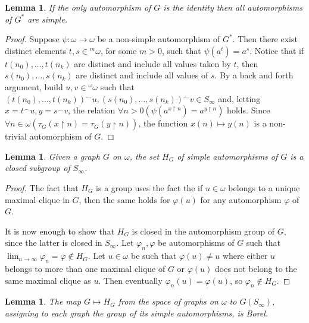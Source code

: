\documentclass{amsart}
\newtheorem{lemma}[theorem]{Lemma}
\theoremstyle{definition}
\theoremstyle{remark}
\begin{document}
\begin{lemma}\label{lemmasimple}
If the only automorphism of $G$ is the identity then all automorphisms
of $G^*$ are simple.
\end{lemma}

\begin{proof}
Suppose $\psi \colon \omega \to \omega $ be a non-simple automorphism of $G^*$.
Then there exist distinct elements $t, s \in {}^m\omega$, for some $m>0$, such that $\psi (a^t)=a^s$.
Notice that if $t(n_0),\dotsc ,t(n_k)$ are distinct and include all
values taken by $t$, then $s(n_0),\dotsc ,s(n_k)$ are distinct and
include all values of $s$.
By a back and forth argument, build $u,v\in {}^{\omega }\omega$ such
that $(t(n_0),\dotsc ,t(n_k))^{\smallfrown }u,(s(n_0),\dotsc
,s(n_k))^{\smallfrown }v \in S_{\infty }$ and, letting
$x=t^{\smallfrown }u,y=s^{\smallfrown }v$, the relation $\forall n>0(\psi(a^{x\restriction n})=a^{y\restriction n})$ holds.
Since $\forall n \in \omega (\tau_G(x\restriction
n)=\tau_G(y\restriction n))$, the function $x(n)\mapsto y(n)$ is a
non-trivial automorphism of $G$.
\end{proof}

\begin{lemma}
Given a graph $G$ on $\omega $, the set $H_G$ of simple
automorphisms of $G$ is a closed subgroup of $S_\infty$.
\end{lemma}

\begin{proof}
The fact that $H_G$ is a group uses the fact the if
$u \in \omega$ belongs to a unique maximal clique in $G$, then the same
holds for ${\varphi} (u)$ for any automorphism ${\varphi}$ of $G$.

It is now enough to show that $H_G$ is closed in the automorphism
group of $G$, since the latter is closed in $S_\infty$.
Let ${\varphi}_n, {\varphi}$ be automorphisms of $G$ such that $\lim_{n \to
  \infty} {\varphi}_n= {\varphi} \notin H_G$.
Let $u \in \omega $ be such that ${\varphi}(u) \neq u$ where either $u$
belongs to more than one maximal clique of $G$ or ${\varphi}(u)$ does not
belong to the same maximal clique as $u$.
Then eventually ${\varphi}_n(u)= {\varphi}(u)$, so ${\varphi}_n \notin H_G$.
\end{proof}

\begin{lemma}\label{lemmaborelmap}
The map $G \mapsto H_G$ from the space of graphs on $\omega $ to
$G(S_\infty)$, assigning to each graph the group of its simple
automorphisms, is Borel.
\end{lemma}
\end{document}
